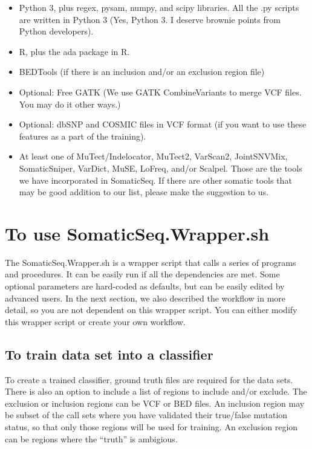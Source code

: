 \documentclass[10pt,letterpaper]{article}
\begin{document}
\begin{sloppypar}
\begin{itemize}
\item
Python 3, plus regex, pysam, numpy, and scipy libraries. All the .py scripts are written in Python 3 (Yes, Python 3. I deserve brownie points from Python developers).

\item
R, plus the ada package in R.

\item
BEDTools (if there is an inclusion and/or an exclusion region file)

\item
Optional: Free GATK (We use GATK CombineVariants to merge VCF files. You may do it other ways.)

\item
Optional: dbSNP and COSMIC files in VCF format (if you want to use these features as a part of the training).

\item
At least one of MuTect/Indelocator, MuTect2, VarScan2, JointSNVMix, SomaticSniper, VarDict, MuSE, LoFreq, and/or Scalpel. Those are the tools we have incorporated in SomaticSeq. If there are other somatic tools that may be good addition to our list, please make the suggestion to us. 

\end{itemize}



\section{To use SomaticSeq.Wrapper.sh}

The SomaticSeq.Wrapper.sh is a wrapper script that calls a series of programs and procedures. It can be easily run if all the dependencies are met. Some optional parameters are hard-coded as defaults, but can be easily edited by advanced users. In the next section, we also described the workflow in more detail, so you are not dependent on this wrapper script. You can either modify this wrapper script or create your own workflow. 


\subsection{To train data set into a classifier}

To create a trained classifier, ground truth files are required for the data sets. There is also an option to include a list of regions to include and/or exclude. The exclusion or inclusion regions can be VCF or BED files. An inclusion region may be subset of the call sets where you have validated their true/false mutation status, so that only those regions will be used for training. An exclusion region can be regions where the ``truth'' is ambigious. 


\end{sloppypar}
\end{document}
